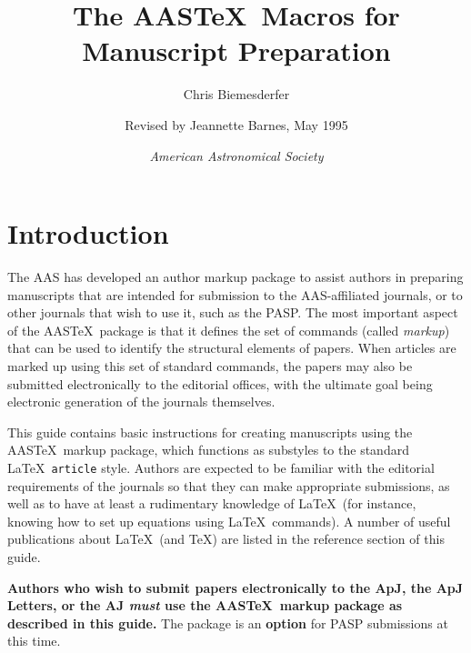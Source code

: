 

\textwidth 7.3in
\hoffset=-0.4in  %
\voffset=-0.4in  %
\def\baselinestretch{0.96}



\twocolumn

\title{The AAS\TeX\ Macros for\\
       Manuscript Preparation}

\author{Chris Biemesderfer}
\author{Revised by Jeannette Barnes, May 1995}
\author{\it American Astronomical Society}

\vspace{.2in}

\section{Introduction}

The AAS has developed an author markup package to assist authors in
preparing manuscripts that
are intended for submission to the AAS-affiliated journals, or to other
journals that wish to use it, such as the PASP.
The most important aspect of the AAS\TeX\
package is that it defines the set of commands (called {\sl markup\/})
that can be used to identify the structural elements of papers.
When articles are marked up using this set of standard commands,
the papers may also be submitted electronically to the editorial
offices, with the ultimate goal being electronic generation of the journals
themselves.

This guide contains basic instructions for creating
manuscripts using the AAS\TeX\ markup package, which functions
as substyles to the standard \LaTeX\ {\tt article} style.
Authors are expected to be familiar with the editorial
requirements of the journals so that they can make
appropriate submissions, as well as to have at least
a rudimentary knowledge of \LaTeX\ (for instance, knowing
how to set up equations using \LaTeX\ commands).
A number of useful publications about \LaTeX\ (and \TeX) are listed in the
reference section of this guide.

{\bf Authors who wish to submit papers electronically to the ApJ, the ApJ
Letters, or the AJ {\sl must} use the AAS\TeX\ markup package as 
described in this guide.}  The package is an {\bf option} for PASP submissions
at this time.

